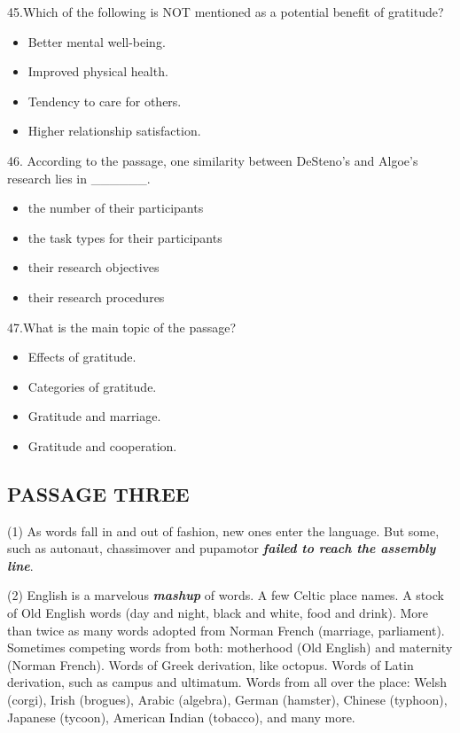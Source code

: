\documentclass[UTF8,11pt]{ctexart}
\begin{document}
45.Which of the following is NOT mentioned as a potential benefit of gratitude?


\begin{itemize}[leftmargin=2em,itemsep=.2em,topsep=.4em]\item[A.] Better mental well-being.
\item[B.] Improved physical health.
\item[C.] Tendency to care for others.
\item[D.] Higher relationship satisfaction.
\end{itemize}

46. According to the passage, one similarity between DeSteno’s and Algoe’s research lies in \_\_\_\_\_\_.


\begin{itemize}[leftmargin=2em,itemsep=.2em,topsep=.4em]\item[A.] the number of their participants
\item[B.] the task types for their participants
\item[C.] their research objectives
\item[D.] their research procedures
\end{itemize}

47.What is the main topic of the passage?


\begin{itemize}[leftmargin=2em,itemsep=.2em,topsep=.4em]\item[A.] Effects of gratitude.
\item[B.] Categories of gratitude.
\item[C.] Gratitude and marriage.
\item[D.] Gratitude and cooperation.
\end{itemize}

\subsection*{\textbf{PASSAGE THREE}}


(1) As words fall in and out of fashion, new ones enter the language. But some, such as autonaut, chassimover and pupamotor \textbf{\textit{failed to reach the assembly line}}.


(2) English is a marvelous \textbf{\textit{mashup}} of words. A few Celtic place names. A stock of Old English words (day and night, black and white, food and drink). More than twice as many words adopted from Norman French (marriage, parliament). Sometimes competing words from both: motherhood (Old English) and maternity (Norman French). Words of Greek derivation, like octopus. Words of Latin derivation, such as campus and ultimatum. Words from all over the place: Welsh (corgi), Irish (brogues), Arabic (algebra), German (hamster), Chinese (typhoon), Japanese (tycoon), American Indian (tobacco), and many more.
\end{document}
